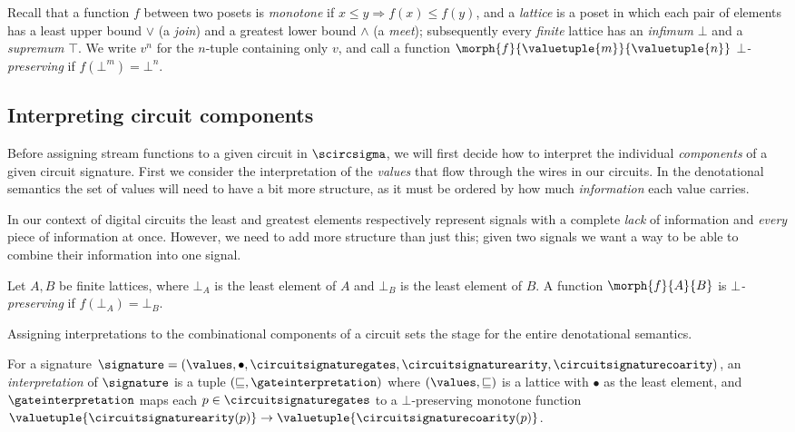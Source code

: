 \documentclass{lmcs}
\begin{document}
Recall that a function \(f\) between two posets is \emph{monotone}
if \(x \leq y \Rightarrow f(x) \leq f(y)\), and a \emph{lattice} is a poset
in which each pair of elements has a least upper bound \(\vee\) (a \emph{join})
and a greatest lower bound \(\wedge\) (a \emph{meet}); subsequently
every \emph{finite} lattice has an \emph{infimum} \(\bot\) and a \emph{supremum}
\(\top\).
We write \(v^n\) for the \(n\)-tuple containing only \(v\), and call a function
\(\morph{f}{\valuetuple{m}}{\valuetuple{n}}\) \emph{\(\bot\)-preserving} if
\(f(\bot^m) = \bot^n\).

\subsection{Interpreting circuit components}\label{sec:interpreting-components}

Before assigning stream functions to a given circuit in \(\scircsigma\), we will
first decide how to interpret the individual \emph{components} of a given
circuit signature.
First we consider the interpretation of the \emph{values} that flow through the
wires in our circuits.
In the denotational semantics the set of values will need to have a bit more
structure, as it must be ordered by how much \emph{information} each value
carries.

In our context of digital circuits the least and greatest elements respectively
represent signals with a complete \emph{lack} of information and \emph{every}
piece of information at once.
However, we need to add more structure than just this; given two signals we want
a way to be able to combine their information into one signal.

\begin{defi}
    Let \(A,B\) be finite lattices, where \(\bot_A\) is the least element of
    \(A\) and \(\bot_B\) is the least element of \(B\).
    A function \(\morph{f}{A}{B}\) is \emph{\(\bot\)-preserving} if
    \(f(\bot_A) = \bot_B\).
\end{defi}

Assigning interpretations to the combinational components of a circuit sets the
stage for the entire denotational semantics.

\begin{defi}[Interpretation]
    For a signature \(
    \signature = (
    \values, \bullet, \circuitsignaturegates, \circuitsignaturearity,
    \circuitsignaturecoarity
    )\), an \emph{interpretation} of
    \(\signature\) is a tuple \((\sqsubseteq, \gateinterpretation)\) where
    \((\values, \sqsubseteq)\) is a lattice with \(\bullet\) as the least
    element, and \(\gateinterpretation\) maps each
    \(p \in \circuitsignaturegates\) to a \(\bot\)-preserving monotone function
    \(
    \valuetuple{\circuitsignaturearity(p)}
    \to
    \valuetuple{\circuitsignaturecoarity(p)}
    \).
\end{defi}
\end{document}
